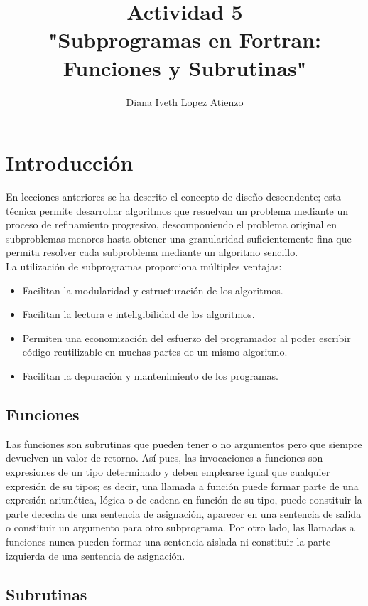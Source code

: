 \documentclass[12pt,a4paper,openright]{article}
\author{Diana Iveth Lopez Atienzo}
\title{Actividad 5 \\"Subprogramas en Fortran: Funciones y Subrutinas"}
\begin{document}
\maketitle

\section*{Introducción}

En lecciones anteriores se ha descrito el concepto de diseño descendente; esta técnica permite desarrollar
algoritmos que resuelvan un problema mediante un proceso de refinamiento progresivo, descomponiendo el problema
original en subproblemas menores hasta obtener una granularidad suficientemente fina que permita resolver cada
subproblema mediante un algoritmo sencillo. \\

La utilización de subprogramas proporciona múltiples ventajas:
\begin{itemize}
\item Facilitan la modularidad y estructuración de los algoritmos.
\item Facilitan la lectura e inteligibilidad de los algoritmos.
\item Permiten una economización del esfuerzo del programador al poder escribir código reutilizable en muchas
partes de un mismo algoritmo.
\item Facilitan la depuración y mantenimiento de los programas.
\end{itemize}


\subsection*{Funciones}

Las funciones son subrutinas que pueden tener o no argumentos pero que siempre devuelven un valor de
retorno. Así pues, las invocaciones a funciones son expresiones de un tipo determinado y deben emplearse igual que
cualquier expresión de su tipos; es decir, una llamada a función puede formar parte de una expresión aritmética, lógica o
de cadena en función de su tipo, puede constituir la parte derecha de una sentencia de asignación, aparecer en una
sentencia de salida o constituir un argumento para otro subprograma. Por otro lado, las llamadas a funciones nunca
pueden formar una sentencia aislada ni constituir la parte izquierda de una sentencia de asignación.

\subsection*{Subrutinas}
\end{document}

